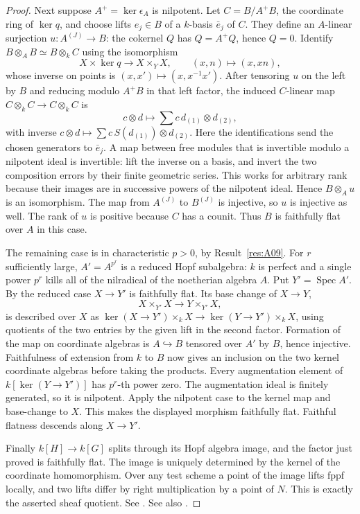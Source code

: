 \documentclass[11pt,a4paper,openany,oneside]{book}
\theoremstyle{resultstyle}
\theoremstyle{definition}
\numberwithin{equation}{chapter}
\begin{document}
\begin{proof}
Next suppose \(A^+=\ker\epsilon_A\) is nilpotent. Let \(C=B/A^+B\), the
coordinate ring of \(\ker q\), and choose lifts \(e_j\in B\) of a
\(k\)-basis \(\bar e_j\) of \(C\). They define an \(A\)-linear surjection
\(u:A^{(J)}\to B\): the cokernel \(Q\) has \(Q=A^+Q\), hence \(Q=0\).
Identify \(B\otimes_A B\simeq B\otimes_k C\) using the isomorphism
\[
 X\times\ker q\longrightarrow X\times_Y X,\qquad
 (x,n)\longmapsto (x,xn),
\]
whose inverse on points is \((x,x')\mapsto(x,x^{-1}x')\).
After tensoring \(u\) on the left by \(B\) and reducing modulo \(A^+B\)
in that left factor, the induced \(C\)-linear map
\(C\otimes_k C\to C\otimes_k C\) is
\[
 c\otimes d\longmapsto \sum c\,d_{(1)}\otimes d_{(2)} ,
\]
with inverse \(c\otimes d\mapsto\sum c\,S(d_{(1)})\otimes d_{(2)}\).
Here the identifications send the chosen generators to \(\bar e_j\).
A map between free modules that is invertible modulo a nilpotent
ideal is invertible: lift the inverse on a basis, and invert the two
composition errors by their finite geometric series. This works for
arbitrary rank because their images are in successive powers of the
nilpotent ideal. Hence \(B\otimes_A u\) is an isomorphism.
The map from \(A^{(J)}\) to \(B^{(J)}\) is injective, so \(u\) is
injective as well. The rank of \(u\) is positive because \(C\) has
a counit. Thus \(B\) is faithfully flat over \(A\) in this case.

The remaining case is in characteristic \(p>0\), by
Result~\ref{res:A09}. For \(r\) sufficiently large,
\(A'=A^{p^r}\) is a reduced Hopf subalgebra: \(k\) is perfect and a
single power \(p^r\) kills all of the nilradical of the noetherian
algebra \(A\). Put \(Y'=\operatorname{Spec}A'\).
By the reduced case \(X\to Y'\) is faithfully flat. Its base change of
\(X\to Y\),
\[
 X\times_{Y'}X\longrightarrow Y\times_{Y'}X,
\]
is described over \(X\) as
\(\ker(X\to Y')\times_k X\to\ker(Y\to Y')\times_k X\), using quotients
of the two entries by the given lift in the second factor. Formation
of the map on coordinate algebras is \(A\hookrightarrow B\)
tensored over \(A'\) by \(B\), hence injective. Faithfulness of
extension from \(k\) to \(B\) now gives an inclusion on the two kernel
coordinate algebras before taking the products. Every augmentation
element of \(k[\ker(Y\to Y')]\) has \(p^r\)-th power zero.
The augmentation ideal is finitely generated, so it is nilpotent.
Apply the nilpotent case to the kernel map and base-change to \(X\).
This makes the displayed morphism faithfully flat. Faithful flatness
descends along \(X\to Y'\).

Finally \(k[H]\to k[G]\) splits through its Hopf algebra image, and the
factor just proved is faithfully flat. The image is uniquely determined
by the kernel of the coordinate homomorphism. Over any test scheme a
point of the image lifts fppf locally, and two lifts differ by right
multiplication by a point of \(N\). This is exactly the asserted
sheaf quotient. See \cite[Theorems 3.31 and 3.34, Definition 5.5 and
Propositions 5.7--5.10]{milne}. See also \cite{takeuchi}.
\end{proof}
\end{document}
